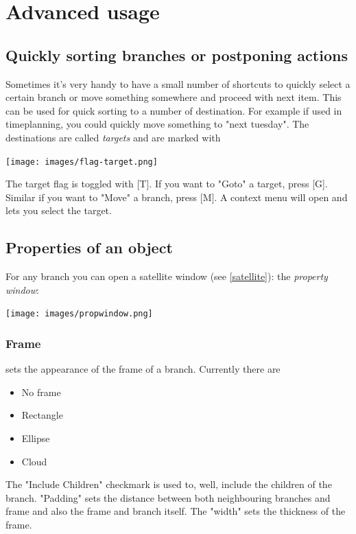 \documentclass[12pt,a4paper]{article}
\newcommand{\key}[1]{[#1]}
\begin{document}
\section{Advanced usage}

\subsection{Quickly sorting branches or postponing actions} \label{targets}
Sometimes it's very handy to have a small number of shortcuts to quickly
select a certain branch or move something somewhere and proceed with
next item. This can be used for quick sorting to a number of
destination. For example if used in timeplanning, you could quickly move something
to "next tuesday". The destinations are called {\em targets} and are
marked with 
\begin{center}
    \texttt{[image: images/flag-target.png]}
    \label{propwindow}
\end{center}
The target flag is toggled with \key{T}. If you want to "Goto" a target,
press \key{G}. Similar if you want to "Move" a branch, press \key{M}.
A context menu will open and lets you select the target.



\subsection{Properties of an object} 
For any branch you can open a satellite window (see \ref{satellite}):
the {\em property window}:
\begin{center}
    \texttt{[image: images/propwindow.png]}
    \label{propwindow}
\end{center}

\subsubsection*{Frame}
sets the appearance of the frame of a branch. Currently there are
\begin{itemize}
    \item No frame
    \item Rectangle
    \item Ellipse
    \item Cloud
\end{itemize}
The "Include Children" checkmark is used to, well, include the children
of the branch. "Padding" sets the distance between both neighbouring
branches and frame and also the frame and branch itself. The "width"
sets the thickness of the frame.
\end{document}
